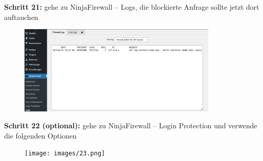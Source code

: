 \documentclass[a4paper]{article}
\begin{document}
\noindent
\textbf{Schritt 21:} gehe zu NinjaFirewall -- Logs, die blockierte Anfrage sollte jetzt dort auftauchen

\begin{figure}[H]
  \centering
  \includegraphics[width=0.85\textwidth]{images/22.png}
\end{figure}

\newpage

\noindent
\textbf{Schritt 22 (optional):} gehe zu NinjaFirewall -- Login Protection und verwende die folgenden Optionen

\begin{figure}[H]
  \centering
  \texttt{[image: images/23.png]}
\end{figure}

\end{document}
